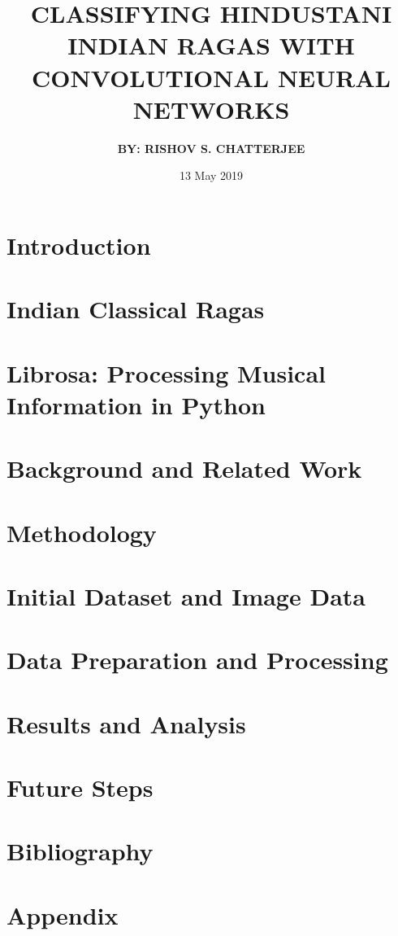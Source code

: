 \documentclass[12pt]{report}
\title{
{\textbf{CLASSIFYING HINDUSTANI INDIAN RAGAS WITH CONVOLUTIONAL NEURAL NETWORKS}}\\
}
\author{\textbf{BY: RISHOV S. CHATTERJEE}}
\date{13 May 2019}
\begin{document}
\maketitle{}



\chapter*{\centering Introduction}


\chapter*{\centering Indian Classical Ragas}


\chapter*{\centering Librosa: Processing Musical Information in Python}


\chapter*{\centering Background and Related Work}


\chapter*{\centering Methodology}


\chapter*{\centering Initial Dataset and Image Data}


\chapter*{\centering Data Preparation and Processing}


\chapter*{\centering Results and Analysis}


\chapter*{\centering Future Steps}


\chapter*{\centering Bibliography}


\chapter*{\centering Appendix}

\end{document}
